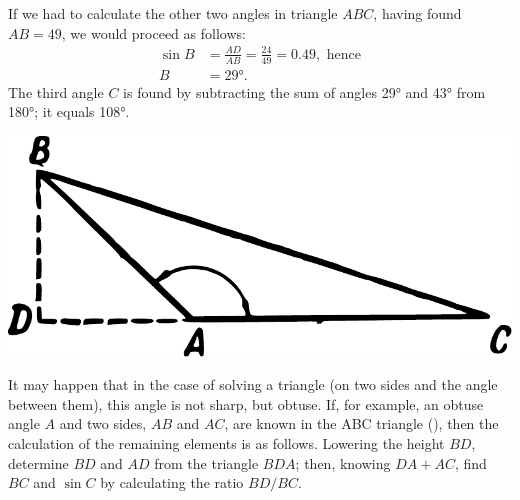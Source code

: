 If we had to calculate the other two angles in triangle $ABC$, having found $AB = 49$, we would proceed as follows: 
\begin{align*}%
\sin B & = \frac{AD}{AB}  = \frac{24}{49} = 0.49,\,\, \text{hence}\\ 
B & = \ang{29}. 
\end{align*}
The third angle $C$ is found by subtracting the sum of angles \ang{29} and \ang{43} from \ang{180}; it equals \ang{108}.


\begin{marginfigure}%
\centering
\includegraphics[width=\textwidth]{figures/ch-05/fig-095.pdf}
\end{marginfigure}

It may happen that in the case of solving a triangle (on two sides and the angle between them), this angle is not sharp, but obtuse. If, for example, an obtuse angle $A$ and two sides, $AB$ and $AC$, are known in the ABC triangle (), then the calculation of the remaining elements is as follows. Lowering the height $BD$, determine $BD$ and $AD$ from the triangle $BDA$; then, knowing $DA + AC$, find $BC$ and $\sin C$ by calculating the ratio $BD / BC$.


